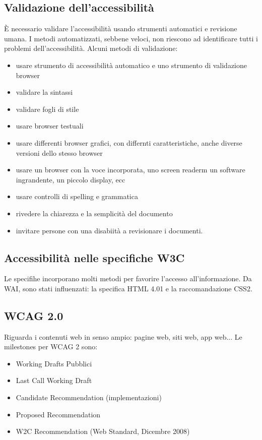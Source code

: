 \documentclass{article}
\begin{document}
\subsection{Validazione dell'accessibilità}
È necessario validare l'accessibilità usando strumenti automatici e revisione umana. I metodi automatizzati, sebbene veloci, non riescono ad identificare tutti i problemi dell'accessibilità. Alcuni metodi di validazione:
\begin{itemize}
	\item usare strumento di accessibilità automatico e uno strumento di validazione browser
	\item validare la sintassi
	\item validare fogli di stile
	\item usare browser testuali
	\item usare differenti browser grafici, con differnti caratteristiche, anche diverse versioni dello stesso browser
	\item usare un browser con la voce incorporata, uno screen readerm un software ingrandente, un piccolo display, ecc
	\item usare controlli di spelling e grammatica
	\item rivedere la chiarezza e la semplicità del documento
	\item invitare persone con una disabiità a revisionare i documenti.
\end{itemize}
\subsection{Accessibilità nelle specifiche W3C}
Le specifihe incorporano molti metodi per favorire l'accesso all'informazione. Da WAI, sono stati influenzati: la specifica HTML 4.01 e la raccomandazione CSS2.
\subsection{WCAG 2.0}
Riguarda i contenuti web in senso ampio: pagine web, siti web, app web...
Le milestones per WCAG 2 sono:
\begin{itemize}
	\item Working Drafts Pubblici
	\item Last Call Working Draft
	\item Candidate Recommendation (implementazioni)
	\item Proposed Recommendation
	\item W2C Recommendation (Web Standard, Dicembre 2008)
\end{itemize}
\end{document}
